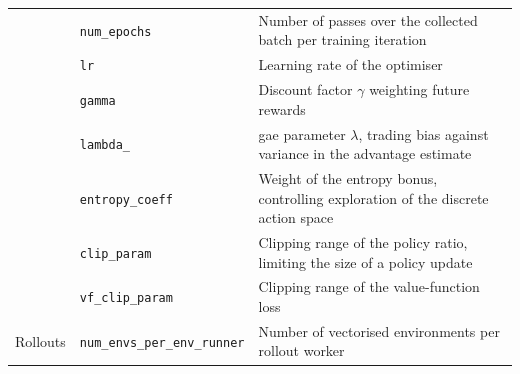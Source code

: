\begin{table}[htbp]
\begin{tabularx}{\textwidth}{@{}llX@{}}
        \hprule
        & \texttt{num\_epochs}            & Number of passes over the collected batch per training iteration \\
        \hprule
        & \texttt{lr}                     & Learning rate of the optimiser \\
        \hprule
        & \texttt{gamma}                  & Discount factor $\gamma$ weighting future rewards \\
        \hprule
        & \texttt{lambda\_}               & \ac{gae} parameter $\lambda$, trading bias against variance in the advantage estimate \\
        \hprule
        & \texttt{entropy\_coeff}         & Weight of the entropy bonus, controlling exploration of the discrete action space \\
        \hprule
        & \texttt{clip\_param}            & Clipping range of the policy ratio, limiting the size of a policy update \\
        \hprule
        & \texttt{vf\_clip\_param}        & Clipping range of the value-function loss \\
    \midrule
    Rollouts
        & \texttt{num\_envs\_per\_env\_runner} & Number of vectorised environments per rollout worker \\
    \bottomrule
  \end{tabularx}
\end{table}

